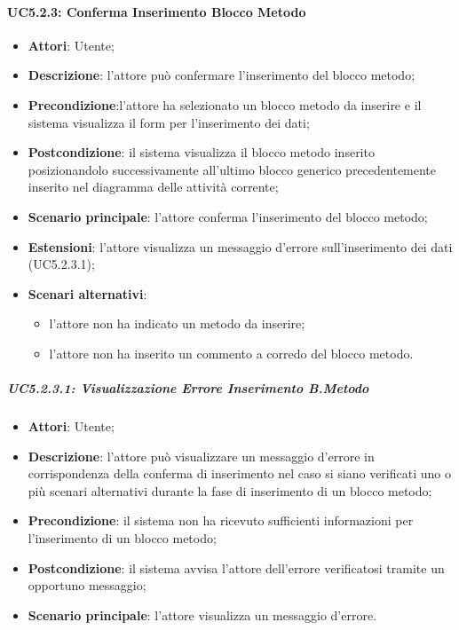 \paragraph{UC5.2.3: Conferma Inserimento Blocco Metodo}
\label{UC5.2.3}
\begin{itemize}
\item \textbf{Attori}: Utente;
\item \textbf{Descrizione}: l'attore può confermare l'inserimento del blocco metodo;	
\item \textbf{Precondizione}:l'attore ha selezionato un blocco metodo da inserire e il sistema visualizza il form per l'inserimento dei dati;	
\item \textbf{Postcondizione}: il sistema visualizza il blocco metodo inserito posizionandolo successivamente all'ultimo blocco generico precedentemente inserito nel diagramma delle attività corrente;		
\item \textbf{Scenario principale}:
l'attore conferma l'inserimento del blocco metodo;	
\item \textbf{Estensioni}:
l'attore visualizza un messaggio d'errore sull'inserimento dei dati (UC5.2.3.1);	
\item \textbf{Scenari alternativi}:
\begin{itemize}
\item l'attore non ha indicato un metodo da inserire;
\item l'attore non ha inserito un commento a corredo del blocco metodo.
\end{itemize}
\end{itemize}

\subparagraph{UC5.2.3.1: Visualizzazione Errore Inserimento B.Metodo}
\label{UC5.2.3.1}
\begin{itemize}
\item \textbf{Attori}: Utente;
\item \textbf{Descrizione}: l'attore può visualizzare un messaggio d'errore in corrispondenza della conferma di inserimento nel caso si siano verificati uno o più scenari alternativi durante la fase di inserimento di un blocco metodo;	
\item \textbf{Precondizione}: il sistema non ha ricevuto sufficienti informazioni per l'inserimento di un blocco metodo;	
\item \textbf{Postcondizione}: il sistema avvisa l'attore dell'errore verificatosi tramite un opportuno messaggio;	
\item \textbf{Scenario principale}:
l'attore visualizza un messaggio d'errore.	
\end{itemize}

